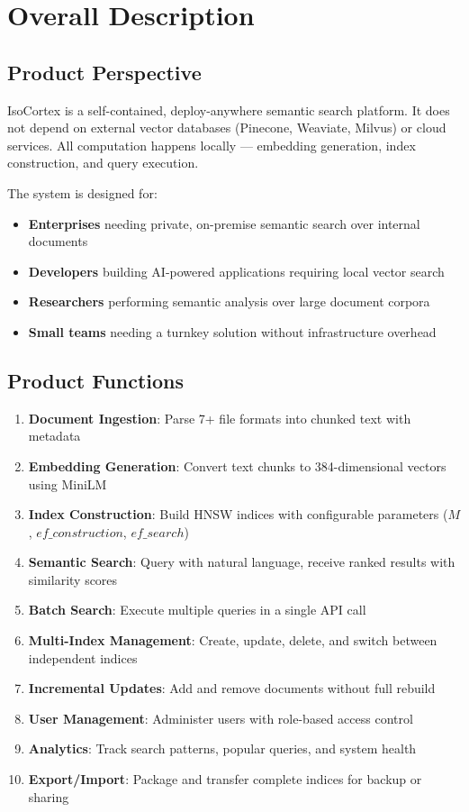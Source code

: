 \documentclass[11pt,a4paper]{article}
\begin{document}
\section{Overall Description}

\subsection{Product Perspective}
IsoCortex is a self-contained, deploy-anywhere semantic search platform. It does not depend on external vector databases (Pinecone, Weaviate, Milvus) or cloud services. All computation happens locally --- embedding generation, index construction, and query execution.

The system is designed for:

\begin{itemize}
    \item \textbf{Enterprises} needing private, on-premise semantic search over internal documents
    \item \textbf{Developers} building AI-powered applications requiring local vector search
    \item \textbf{Researchers} performing semantic analysis over large document corpora
    \item \textbf{Small teams} needing a turnkey solution without infrastructure overhead
\end{itemize}

\subsection{Product Functions}
\begin{enumerate}
    \item \textbf{Document Ingestion}: Parse 7+ file formats into chunked text with metadata
    \item \textbf{Embedding Generation}: Convert text chunks to 384-dimensional vectors using MiniLM
    \item \textbf{Index Construction}: Build HNSW indices with configurable parameters ($M$, $ef\_construction$, $ef\_search$)
    \item \textbf{Semantic Search}: Query with natural language, receive ranked results with similarity scores
    \item \textbf{Batch Search}: Execute multiple queries in a single API call
    \item \textbf{Multi-Index Management}: Create, update, delete, and switch between independent indices
    \item \textbf{Incremental Updates}: Add and remove documents without full rebuild
    \item \textbf{User Management}: Administer users with role-based access control
    \item \textbf{Analytics}: Track search patterns, popular queries, and system health
    \item \textbf{Export/Import}: Package and transfer complete indices for backup or sharing
\end{enumerate}
\end{document}

